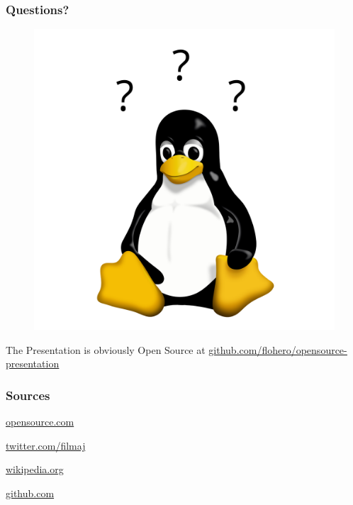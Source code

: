 \documentclass{beamer}
\begin{document}
\begin{frame}
  \frametitle{Questions?}
  \begin{center}
    \begin{figure}
      \includegraphics[scale=0.3]{./img/tux_questions.png}
    \end{figure}
    The Presentation is obviously Open Source at
    \underline{
      \href{https://github.com/flohero/opensource-presentation}
           {github.com/flohero/opensource-presentation}
    }
    \end{center}
\end{frame}

\begin{frame}
  \frametitle{Sources}
  \begin{center}
    \Large
    \href{https://opensource.com/open-source-way}{opensource.com}
    
    \href{https://twitter.com/filmaj}{twitter.com/filmaj}

    \href{https://en.wikipedia.org}{wikipedia.org}

    \href{https://github.com}{github.com}
    
  \end{center}
\end{frame}
\end{document}
